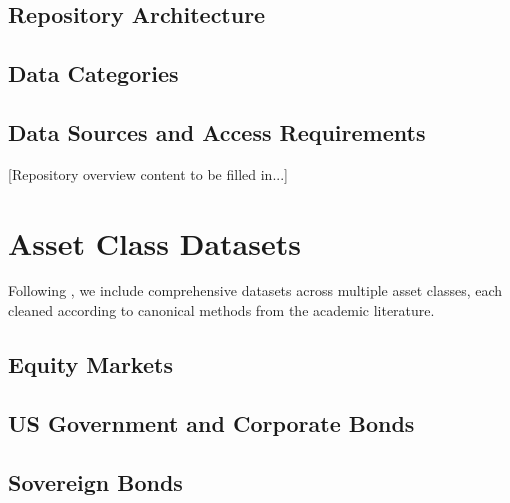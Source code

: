 \documentclass{article}
\begin{document}
\subsection{Repository Architecture}

\subsection{Data Categories}

\subsection{Data Sources and Access Requirements}

[Repository overview content to be filled in...]

\section{Asset Class Datasets}
\label{sec:asset_classes}


Following \cite{He2017}, we include comprehensive datasets across multiple asset classes, each cleaned according to canonical methods from the academic literature.

\subsection{Equity Markets}
\label{sec:equity}

\subsection{US Government and Corporate Bonds}
\label{sec:bonds}

\subsection{Sovereign Bonds}
\label{sec:sovereign}
\end{document}
